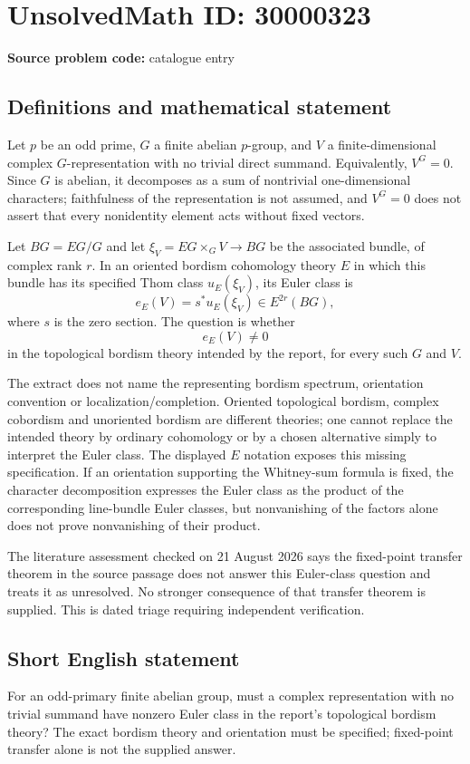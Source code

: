 \documentclass[11pt]{article}
\begin{document}
\section*{UnsolvedMath ID: 30000323}
\textbf{Source problem code:} catalogue entry
\subsection{Definitions and mathematical statement}
Let $p$ be an odd prime, $G$ a finite abelian $p$-group, and $V$ a finite-dimensional complex $G$-representation with no trivial direct summand. Equivalently, $V^G=0$. Since $G$ is abelian, it decomposes as a sum of nontrivial one-dimensional characters; faithfulness of the representation is not assumed, and $V^G=0$ does not assert that every nonidentity element acts without fixed vectors.

Let $BG=EG/G$ and let $\xi_V=EG\times_G V\to BG$ be the associated bundle, of complex rank $r$. In an oriented bordism cohomology theory $E$ in which this bundle has its specified Thom class $u_E(\xi_V)$, its Euler class is
\[
 e_E(V)=s^*u_E(\xi_V)\in E^{2r}(BG),
\]
where $s$ is the zero section. The question is whether
\[
 e_E(V)\ne0
\]
in the topological bordism theory intended by the report, for every such $G$ and $V$.

The extract does not name the representing bordism spectrum, orientation convention or localization/completion. Oriented topological bordism, complex cobordism and unoriented bordism are different theories; one cannot replace the intended theory by ordinary cohomology or by a chosen alternative simply to interpret the Euler class. The displayed $E$ notation exposes this missing specification. If an orientation supporting the Whitney-sum formula is fixed, the character decomposition expresses the Euler class as the product of the corresponding line-bundle Euler classes, but nonvanishing of the factors alone does not prove nonvanishing of their product.

The literature assessment checked on 21 August 2026 says the fixed-point transfer theorem in the source passage does not answer this Euler-class question and treats it as unresolved. No stronger consequence of that transfer theorem is supplied. This is dated triage requiring independent verification.
\subsection{Short English statement}
For an odd-primary finite abelian group, must a complex representation with no trivial summand have nonzero Euler class in the report's topological bordism theory? The exact bordism theory and orientation must be specified; fixed-point transfer alone is not the supplied answer.
\end{document}
